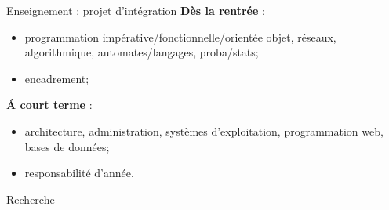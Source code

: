 \documentclass[11pt, aspectratio=149]{beamer}
\begin{document}
\begin{frame}{Enseignement : projet d'intégration}
	\textbf{Dès la rentrée} : 
	\begin{itemize}
		\item programmation impérative/fonctionnelle/orientée objet, réseaux, algorithmique, automates/langages, proba/stats;
		\item encadrement;
	\end{itemize}
	\textbf{\'{A} court terme} :
	\begin{itemize}
		\item architecture, administration, systèmes d'exploitation, programmation web, bases de données;
		\item responsabilité d'année.
	\end{itemize}
 \end{frame}



\begin{frame}{Recherche}
    \begin{figure}
        \centering
        \def\svgwidth{\textwidth}
        
    \end{figure}
\end{frame}
\end{document}
